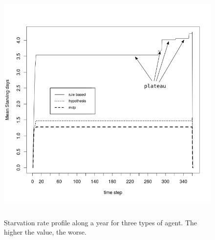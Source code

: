 \documentclass[11pt,oneside,a4paper,openright]{report}
\begin{document}
\begin{figure}[!htb]
\centering
\includegraphics[height=12.2cm]{figures/expm/BW_markovMoveHypothesis_TAGGED}
\caption{Starvation rate profile along a year for three types of agent. The higher the value, the worse.}
\label{fig:markov_move}
\end{figure}
\end{document}
